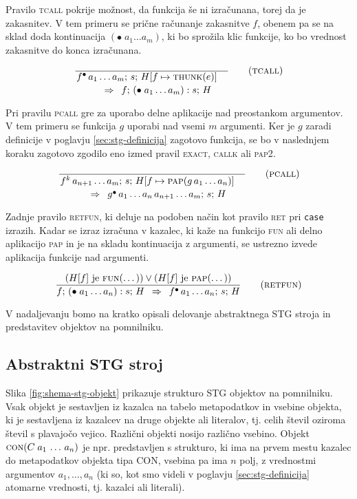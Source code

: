 Pravilo \textsc{tcall} pokrije možnost, da funkcija še ni izračunana, torej da je zakasnitev. V tem primeru se prične računanje zakasnitve $f$, obenem pa se na sklad doda kontinuacija $(\bullet \; a_1 \dots a_m)$, ki bo sprožila klic funkcije, ko bo vrednost zakasnitve do konca izračunana.

\begin{equation}
	\linfer[tcall]{}{
		f^\bullet \, a_1 \dots a_m ; \, s; \, H[f \mapsto \textsc{thunk}(e)]
	}{
		f; \, (\bullet \; a_1 \dots a_m) : s; \, H
	}
\end{equation}

Pri pravilu \textsc{pcall} gre za uporabo delne aplikacije nad preostankom argumentov. V tem primeru se funkcija $g$ uporabi nad vsemi $m$ argumenti. Ker je $g$ zaradi definicije v poglavju \ref{sec:stg-definicija} zagotovo funkcija, se bo v naslednjem koraku zagotovo zgodilo eno izmed pravil \textsc{exact}, \textsc{callk} ali \textsc{pap2}.

\begin{equation}
	\linfer[pcall]{}{
		f^k \, a_{n + 1} \dots a_m ; \, s; \, H[f \mapsto \textsc{pap}(g \, a_1 \dots a_n)]
	}{
		g^\bullet \, a_1 \dots a_n \, a_{n + 1} \dots a_m; \, s; \, H
	}
\end{equation}

Zadnje pravilo \textsc{retfun}, ki deluje na podoben način kot pravilo \textsc{ret} pri \texttt{case} izrazih. Kadar se izraz izračuna v kazalec, ki kaže na funkcijo \textsc{fun} ali delno aplikacijo \textsc{pap} in je na skladu kontinuacija z argumenti, se ustrezno izvede aplikacija funkcije nad argumenti.

\begin{equation}
	\infer[retfun]{
		(\text{$H[f]$ je \textsc{fun}(\dots)}) \lor (\text{$H[f]$ je \textsc{pap}(\dots)})
	}{
		f; \, (\bullet \; a_1 \dots a_n) : s; \, H
	}{
		f^\bullet \, a_1 \dots a_n; \, s; \, H
	}
\end{equation}

V nadaljevanju bomo na kratko opisali delovanje abstraktnega STG stroja in predstavitev objektov na pomnilniku.

\subsection{Abstraktni STG stroj}
\label{sec:abstraktni-stg-stroj}


Slika \ref{fig:shema-stg-objekt} prikazuje strukturo STG objektov na pomnilniku. Vsak objekt je sestavljen iz kazalca na tabelo metapodatkov in vsebine objekta, ki je sestavljena iz kazalcev na druge objekte ali literalov, tj. celih števil oziroma števil s plavajočo vejico. Različni objekti nosijo različno vsebino. Objekt $\textsc{con}(C \; a_1 \, \dots \, a_n)$ je npr. predstavljen s strukturo, ki ima na prvem mestu kazalec do metapodatkov objekta tipa CON, vsebina pa ima $n$ polj, z vrednostmi argumentov $a_1, \dots, a_n$ (ki so, kot smo videli v poglavju \ref{sec:stg-definicija} atomarne vrednosti, tj. kazalci ali literali). 

